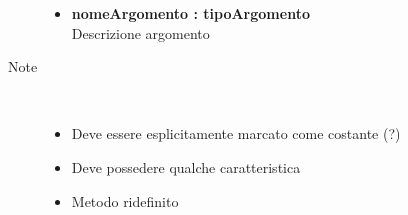 \begin{description}
\begin{description}
\begin{description}
\begin{itemize}
					\item \textbf{nomeArgomento : tipoArgomento			} \hfill \\
					Descrizione argomento
					
				\end{itemize}
			\item[Note] \hfill \\
			\begin{itemize}
					\item Deve essere esplicitamente marcato come costante (?)
					\item Deve possedere qualche caratteristica
					\item Metodo ridefinito
				\end{itemize}
		\end{description}
	\end{description}
	
	
	
\end{description}